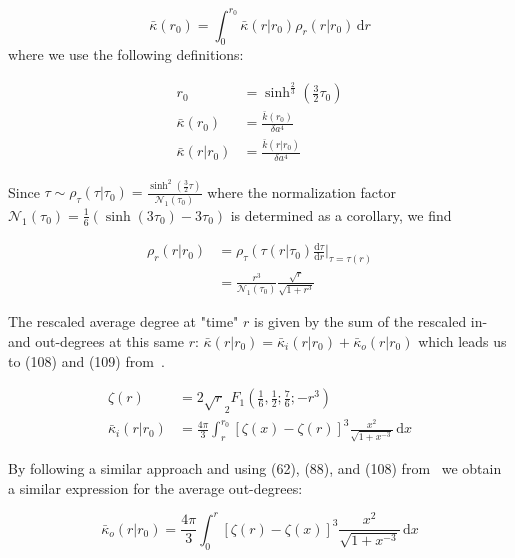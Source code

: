 \documentclass[preprint,notitlepage,amsmath,amssymb,floatfix]{revtex4-1}
\begin{document}
\begin{equation}
\bar\kappa\left(r_0\right) = \int_0^{r_0}\!\bar\kappa\left(r|r_0\right)\rho_r\left(r|r_0\right)\,\mathrm dr 
\end{equation}
\noindent where we use the following definitions:

\begin{align}
r_0 &= \sinh^{\frac{2}{3}}\left(\frac{3}{2}\tau_0\right) \\
\bar\kappa\left(r_0\right) &= \frac{\bar k\left(r_0\right)}{\delta a^4} \\
\bar\kappa\left(r|r_0\right) &= \frac{\bar k\left(r|r_0\right)}{\delta a^4}
\end{align}

\noindent Since $\tau \sim \rho_\tau\left(\tau|\tau_0\right) = \frac{\sinh^2\left(\frac{3}{2}\tau\right)}{\mathcal{N}_1\left(\tau_0\right)}$ where the normalization factor $\mathcal{N}_1\left(\tau_0\right) = \frac{1}{6}\left(\sinh\left(3\tau_0\right) - 3\tau_0\right)$ is determined as a corollary, we find

\begin{equation}
\begin{split}
\rho_r\left(r|r_0\right) &= \rho_\tau\left(\tau\left(r\right|\tau_0\right)\frac{\mathrm d\tau}{\mathrm dr}|_{\tau=\tau\left(r\right)} \\
 &= \frac{r^3}{\mathcal{N}_1\left(\tau_0\right)}\frac{\sqrt r}{\sqrt{1+r^3}}
\end{split}
\end{equation}

\noindent The rescaled average degree at "time" $r$ is given by the sum of the rescaled in- and out-degrees at this same $r$:  $\bar\kappa\left(r|r_0\right) = \bar\kappa_i\left(r|r_0\right) + \bar\kappa_o\left(r|r_0\right)$ which leads us to (108) and (109) from~\cite{ref:snc2012}.

\begin{align}
\zeta\left(r\right) &= 2\sqrt r _2F_1\left(\frac{1}{6},\frac{1}{2};\frac{7}{6}; -r^3\right) \\
\bar\kappa_i\left(r|r_0\right) &= \frac{4\pi}{3}\int_r^{r_0}\!\left[\zeta\left(x\right)-\zeta\left(r\right)\right]^3\frac{x^2}{\sqrt{1+x^{-3}}}\,\mathrm dx
\end{align}

\noindent By following a similar approach and using (62), (88), and (108) from~\cite{ref:snc2012} we obtain a similar expression for the average out-degrees:

\begin{equation}
\bar\kappa_o\left(r|r_0\right) = \frac{4\pi}{3}\int_0^r\!\left[\zeta\left(r\right) - \zeta\left(x\right)\right]^3\frac{x^2}{\sqrt{1+x^{-3}}}\,\mathrm dx
\end{equation}
\end{document}
